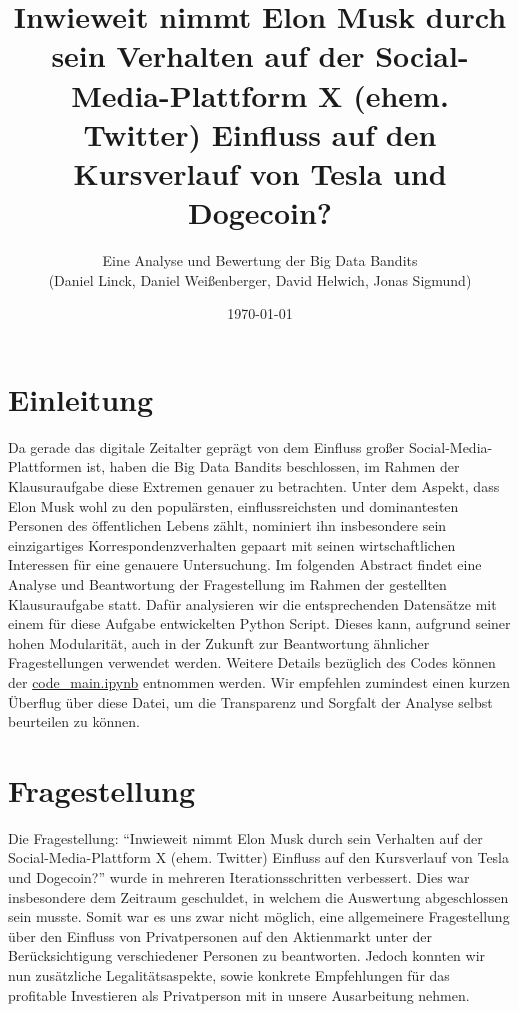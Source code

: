 \documentclass{article}
\title{\textbf {Inwieweit nimmt Elon Musk durch sein Verhalten auf der Social-Media-Plattform X (ehem. Twitter) Einfluss auf den Kursverlauf von Tesla und Dogecoin?}}
\author{Eine Analyse und Bewertung der Big Data Bandits \\ (Daniel Linck, Daniel Weißenberger, David Helwich, Jonas Sigmund)}
\date{\today}
\begin{document}
\maketitle

\tableofcontents
\newpage

\section{Einleitung} \label{Einleitung}
Da gerade das digitale Zeitalter geprägt von dem Einfluss großer Social-Media-Plattformen ist, haben die Big Data Bandits beschlossen, im Rahmen der Klausuraufgabe diese Extremen genauer zu betrachten.
Unter dem Aspekt, dass Elon Musk wohl zu den populärsten, einflussreichsten und dominantesten Personen des öffentlichen Lebens zählt, nominiert ihn insbesondere sein einzigartiges Korrespondenzverhalten gepaart mit seinen wirtschaftlichen Interessen für eine genauere Untersuchung.
Im folgenden Abstract findet eine Analyse und Beantwortung der Fragestellung im Rahmen der gestellten Klausuraufgabe statt.
Dafür analysieren wir die entsprechenden Datensätze mit einem für diese Aufgabe entwickelten Python Script.
Dieses kann, aufgrund seiner hohen Modularität, auch in der Zukunft zur Beantwortung ähnlicher Fragestellungen verwendet werden.
Weitere Details bezüglich des Codes können der \href{https://github.com/alphaname007/BigDataBandits/blob/19beac1a6b5469aed05b4a6c072883810df6aacd/code\_main.ipynb}{code\_main.ipynb} entnommen werden.
Wir empfehlen zumindest einen kurzen Überflug über diese Datei, um die Transparenz und Sorgfalt der Analyse selbst beurteilen zu können.


\section{Fragestellung} \label{Fragestellung}
Die Fragestellung: ``Inwieweit nimmt Elon Musk durch sein Verhalten auf der Social-Media-Plattform X (ehem. Twitter) Einfluss auf den Kursverlauf von Tesla und Dogecoin?'' wurde in mehreren Iterationsschritten verbessert. 
Dies war insbesondere dem Zeitraum geschuldet, in welchem die Auswertung abgeschlossen sein musste.
Somit war es uns zwar nicht möglich, eine allgemeinere Fragestellung über den Einfluss von Privatpersonen auf den Aktienmarkt unter der Berücksichtigung verschiedener Personen zu beantworten.
Jedoch konnten wir nun zusätzliche Legalitätsaspekte, sowie konkrete Empfehlungen für das profitable Investieren als Privatperson mit in unsere Ausarbeitung nehmen.
\end{document}
